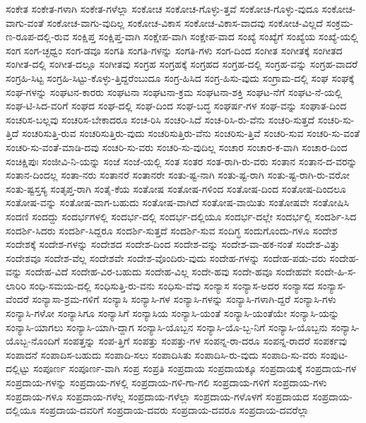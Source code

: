 {ಸಂಕೇತ
ಸಂಕೇತ-ಗಳಾಗಿ
ಸಂಕೇತ-ಗಳೆಲ್ಲಾ
ಸಂಕೋಚ
ಸಂಕೋಚ-ಗೊಳ್ಳು-ತ್ತವೆ
ಸಂಕೋಚ-ಗೊಳ್ಳು-ವುದೂ
ಸಂಕೋಚ-ವಾಗು-ವಂತೆ
ಸಂಕೋಚ-ವಾಗು-ವುದಿಲ್ಲ
ಸಂಕೋಚ-ವಿಕಾಸ
ಸಂಕೋಚ-ವಿಕಾಸ-ವಾದವು
ಸಂಕೋಚ-ವಿಲ್ಲದೆ
ಸಂಕ್ರಮ-ಣ-ರೂಪ-ದಲ್ಲಿ-ರುವ
ಸಂಕ್ಷಿಪ್ತ
ಸಂಕ್ಷಿಪ್ತ-ವಾಗಿ
ಸಂಕ್ಷೇಪ-ವಾಗಿ
ಸಂಕ್ಷೇಪ-ವಾದ
ಸಂಖ್ಯೆ
ಸಂಖ್ಯೆಗೆ
ಸಂಖ್ಯೆಯ
ಸಂಖ್ಯೆ-ಯಲ್ಲಿ
ಸಂಗ
ಸಂಗ-ಚ್ಛಧ್ವಂ
ಸಂಗ-ಡವೂ
ಸಂಗತಿ
ಸಂಗತಿ-ಗಳನ್ನು
ಸಂಗತಿ-ಗಳು
ಸಂಗ-ದಿಂದ
ಸಂಗೀತ
ಸಂಗೀತಕ್ಕೆ
ಸಂಗೀತದ
ಸಂಗೀತ-ದಲ್ಲಿ
ಸಂಗೀತ-ದಲ್ಲೂ
ಸಂಗೀತವು
ಸಂಗ್ರಹ
ಸಂಗ್ರಹಕ್ಕೆ
ಸಂಗ್ರಹದ
ಸಂಗ್ರಹ-ದಲ್ಲಿ
ಸಂಗ್ರಹ-ವನ್ನು
ಸಂಗ್ರಹ-ವಾದರೆ
ಸಂಗ್ರಹಿ-ಸಿಟ್ಟ
ಸಂಗ್ರಹಿ-ಸಿಟ್ಟು-ಕೊಳ್ಳು-ತ್ತಿದ್ದರೆಂಬುದೂ
ಸಂಗ್ರ-ಹಿಸಿದ
ಸಂಗ್ರ-ಹಿಸು-ವುದು
ಸಂಗ್ರಾಮ-ದಲ್ಲಿ
ಸಂಘ
ಸಂಘಕ್ಕೆ
ಸಂಘ-ಗಳನ್ನು
ಸಂಘಟನ-ಕಾರರು
ಸಂಘಟನಾ
ಸಂಘಟನಾ-ಕ್ರಮ
ಸಂಘಟನಾ-ಶಕ್ತಿ
ಸಂಘಟ-ನೆಗೆ
ಸಂಘಟ-ನೆ-ಯಲ್ಲಿ
ಸಂಘ-ಟಿ-ಸಿದ-ವರಿಗೆ
ಸಂಘದ
ಸಂಘ-ದಲ್ಲಿ
ಸಂಘ-ದಿಂದ
ಸಂಘ-ಬದ್ಧ
ಸಂಘರ್ಷ-ಗಳ
ಸಂಘ-ವನ್ನು
ಸಂಘಾತ-ದಿಂದ
ಸಂಚರಿಸ-ಬಲ್ಲವು
ಸಂಚರಿಸ-ಬೇಕಾದರೂ
ಸಂಚ-ರಿಸಿ
ಸಂಚರಿ-ಸಿದೆ
ಸಂಚ-ರಿಸಿ-ರು-ವೆನು
ಸಂಚರಿ-ಸುತ್ತದೆ
ಸಂಚರಿ-ಸು-ತ್ತಿದೆ
ಸಂಚರಿಸುತ್ತಿ-ರುವ
ಸಂಚರಿಸುತ್ತಿರು-ವುದು
ಸಂಚರಿಸುತ್ತಿರು-ವೆನು
ಸಂಚರಿಸು-ತ್ತಿವೆ
ಸಂಚರಿ-ಸುವ
ಸಂಚರಿ-ಸು-ವಂತೆ
ಸಂಚರಿ-ಸು-ವಂತೆ-ಮಾಡಿ-ದವು
ಸಂಚರಿ-ಸು-ವರು
ಸಂಚರಿ-ಸು-ವುದಿಲ್ಲ
ಸಂಚಾರ
ಸಂಚಾರ-ಕ-ವಾಗಿ
ಸಂಚಾರ-ದಿಂದ
ಸಂಚಿಕ್ಷಿಪುಃ
ಸಂಜೀವಿ-ನಿ-ಯನ್ನು
ಸಂಜೆ
ಸಂಜೆ-ಯಲ್ಲಿ
ಸಂತ
ಸಂತರ
ಸಂತ-ರಾಗಿ-ರು-ವರು
ಸಂತಾನ
ಸಂತಾನ-ದ-ವರನ್ನು
ಸಂತಾನ-ದಿಂದಲ್ಲ
ಸಂತಾ-ನರು
ಸಂತಾನರೆ
ಸಂತಾನರೇ
ಸಂತು-ಷ್ಟ-ನಾಗಿ
ಸಂತು-ಷ್ಟ-ರಾಗಿ
ಸಂತು-ಷ್ಟ-ರಾಗಿ-ರು-ವರೋ
ಸಂತು-ಷ್ಟಸ್ತಸ್ಯ
ಸಂತೃಪ್ತ-ರಾಗಿ
ಸಂತೈ-ಕೆಯ
ಸಂತೋಷ
ಸಂತೋಷ-ಗಳಿಂದ
ಸಂತೋಷ-ದಿಂದ
ಸಂತೋಷ-ದಿಂದಲೂ
ಸಂತೋಷ-ವನ್ನು
ಸಂತೋಷ-ವಾಗ-ಬಹುದು
ಸಂತೋಷ-ವಾಗಿದೆ
ಸಂತೋಷ-ವಾಯಿತು
ಸಂತೋಷವೇ
ಸಂತೋಷಿಸಿ
ಸಂದಣಿ
ಸಂದದ್ದು
ಸಂದರ್ಭಗಳಲ್ಲಿ
ಸಂದರ್ಭ-ದಲ್ಲಿ
ಸಂದರ್ಭ-ದಲ್ಲಿಯೂ
ಸಂದರ್ಭ-ದಲ್ಲೇ
ಸಂದರ್ಭಲ್ಲಿ
ಸಂದರ್ಶಿ-ಸಿದ
ಸಂದರ್ಶಿ-ಸಿದರು
ಸಂದರ್ಶಿ-ಸಿದ್ದರೂ
ಸಂದರ್ಶಿ-ಸುತ್ತದೆ
ಸಂದರ್ಶಿ-ಸುವ
ಸಂದಿಗ್ಧ
ಸಂದುಗೊಂದು-ಗಳೂ
ಸಂದೇಶ
ಸಂದೇಶಕ್ಕೆ
ಸಂದೇಶ-ಗಳನ್ನು
ಸಂದೇಶದ
ಸಂದೇಶ-ದಿಂದ
ಸಂದೇಶ-ವನ್ನು
ಸಂದೇಶ-ವಾ-ಹಕ-ನಂತೆ
ಸಂದೇಶ-ವಿತ್ತು
ಸಂದೇಶವೂ
ಸಂದೇಶ-ವೆಲ್ಲ
ಸಂದೇಶವೇ
ಸಂದೇಶ-ವೊಂದಿರು-ವುದು
ಸಂದೇಹ-ಗಳನ್ನು
ಸಂದೇಹ-ಪಡು-ವರು
ಸಂದೇಹ-ವನ್ನು
ಸಂದೇಹ-ವಿದೆ
ಸಂದೇಹ-ವಿರ-ಬಹುದು
ಸಂದೇಹ-ವಿಲ್ಲ
ಸಂದೇ-ಹವು
ಸಂದೇ-ಹವೂ
ಸಂದೇಹವೇ
ಸಂದೇ-ಹಿ-ಸ-ಲಾರಿರಿ
ಸಂಧಿ-ಸಮಯ-ದಲ್ಲಿ
ಸಂಧಿಸುತ್ತಿ-ರು-ವನು
ಸಂಧಿಸು-ವೆವು
ಸಂನ್ಯಾಸ
ಸಂನ್ಯಾಸ-ಅದರ
ಸಂನ್ಯಾಸದ
ಸಂನ್ಯಾಸ-ವೆಂದರೆ
ಸಂನ್ಯಾಸಾ-ಶ್ರಮ-ಗಳಿಗೆ
ಸಂನ್ಯಾಸಿ
ಸಂನ್ಯಾಸಿ-ಗಳ
ಸಂನ್ಯಾಸಿ-ಗಳನ್ನು
ಸಂನ್ಯಾಸಿ-ಗಳಾಗಿ-ದ್ದರೆ
ಸಂನ್ಯಾಸಿ-ಗಳು
ಸಂನ್ಯಾಸಿ-ಗಳೋ
ಸಂನ್ಯಾಸಿಗೂ
ಸಂನ್ಯಾಸಿಗೆ
ಸಂನ್ಯಾಸಿಯ
ಸಂನ್ಯಾಸಿ-ಯಂತೆ
ಸಂನ್ಯಾಸಿ-ಯಂತೆಯೇ
ಸಂನ್ಯಾಸಿ-ಯನ್ನು
ಸಂನ್ಯಾಸಿ-ಯಾಗಲು
ಸಂನ್ಯಾಸಿ-ಯಾಗಿ-ದ್ದಾಗ
ಸಂನ್ಯಾಸಿ-ಯೊಬ್ಬನ
ಸಂನ್ಯಾಸಿ-ಯೊ-ಬ್ಬ-ನಿಗೆ
ಸಂನ್ಯಾಸಿ-ಯೊಬ್ಬನು
ಸಂನ್ಯಾಸಿ-ಯೊಬ್ಬ-ನೊಂದಿಗೆ
ಸಂಪತ್ತನ್ನು
ಸಂಪ-ತ್ತಿಗೆ
ಸಂಪತ್ತು
ಸಂಪತ್ತು-ಗಳ
ಸಂಪನ್ನ-ರಾ-ದರೂ
ಸಂಪನ್ನ-ರಾದರೆ
ಸಂಪರ್ಕವು
ಸಂಪಾದನೆ
ಸಂಪಾದಿಸ-ಬಹುದು
ಸಂಪಾದಿ-ಸಲು
ಸಂಪಾದಿಸಿತು
ಸಂಪಾದಿಸಿ-ರು-ವುದು
ಸಂಪಾದಿ-ಸು-ವರು
ಸಂಪುಟ-ದಲ್ಲಿಟ್ಟು
ಸಂಪೂರ್ಣ
ಸಂಪೂರ್ಣ-ವಾಗಿ
ಸಂಪ್ರ
ಸಂಪ್ರತಿ
ಸಂಪ್ರದಾಯ
ಸಂಪ್ರದಾಯಕ್ಕೂ
ಸಂಪ್ರದಾಯಕ್ಕೆ
ಸಂಪ್ರದಾಯ-ಗಳ
ಸಂಪ್ರದಾಯ-ಗಳನ್ನು
ಸಂಪ್ರದಾಯ-ಗಳಲ್ಲಿ
ಸಂಪ್ರದಾಯ-ಗಳಿ-ಗಾ-ಗಲಿ
ಸಂಪ್ರದಾಯ-ಗಳಿಗೆ
ಸಂಪ್ರದಾಯ-ಗಳು
ಸಂಪ್ರದಾಯ-ಗಳೂ
ಸಂಪ್ರದಾಯ-ಗಳೆಲ್ಲ
ಸಂಪ್ರದಾಯ-ಗಳೆಲ್ಲಾ
ಸಂಪ್ರದಾಯ-ಗಳೊಳಗೆ
ಸಂಪ್ರದಾಯದ
ಸಂಪ್ರದಾಯ-ದಲ್ಲಿಯೂ
ಸಂಪ್ರದಾಯ-ದವರಿಗೆ
ಸಂಪ್ರದಾಯ-ದವರು
ಸಂಪ್ರದಾಯ-ದವರೂ
ಸಂಪ್ರದಾಯ-ದವರೆಲ್ಲಾ
}
